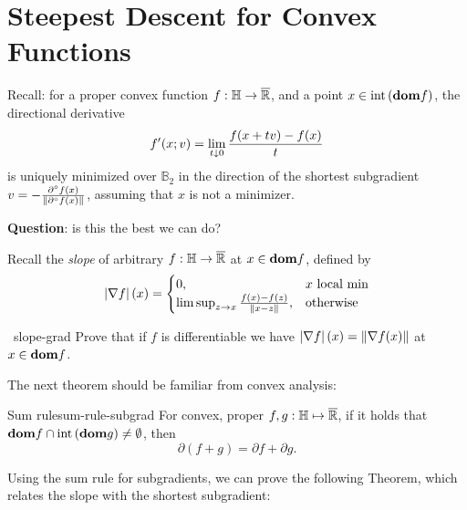 \section{Steepest Descent for Convex Functions}

Recall: for a proper convex function $f: \mathbb{H} \to \overline{\mathbb{R}}$, and a point
$x \in \mathrm{int}\left( \textbf{dom} f \right)$, the directional derivative
\[
	f'(x; v) = \lim_{t \downarrow 0} \frac{f(x + tv) - f(x)}{t}
\]
is uniquely minimized over $\mathbb{B}_2$ in the direction of the shortest
subgradient $v = -\frac{\partial^{\circ} f(x)}{\left \| \partial^{\circ} f(x) \right \|}$,
assuming that $x$ is not a minimizer.

\textbf{Question}: is this the best we can do?

Recall the \textit{slope} of arbitrary $f: \mathbb{H} \to \overline{\mathbb{R}}$ at $x \in
\textbf{dom} f$, defined by
\[
	\left| \nabla f \right|(x) = \begin{cases}
		0, & x \text{ local min} \\
		\limsup_{z \to x} \frac{f(x) - f(z)}{\left \| x - z \right \|}, & \text{otherwise}
	\end{cases}
\]

\begin{exercise}{~}{slope-grad}
	Prove that if $f$ is differentiable we have $\left| \nabla f \right|(x) = \left \| \nabla
	f(x) \right \|$ at $x \in \textbf{dom} f$.
\end{exercise}

The next theorem should be familiar from convex analysis:
\begin{ctheorem}{Sum rule}{sum-rule-subgrad}
	For convex, proper $f, g : \mathbb{H} \mapsto \overline{\mathbb{R}}$, if it holds that
	$\textbf{dom} f \cap \mathrm{int}\left( \textbf{dom} g \right) \neq \emptyset$, then
	\[
		\partial (f + g) = \partial f + \partial g.
	\]
\end{ctheorem}

Using the sum rule for subgradients, we can prove the following Theorem, which
relates the slope with the shortest subgradient:

